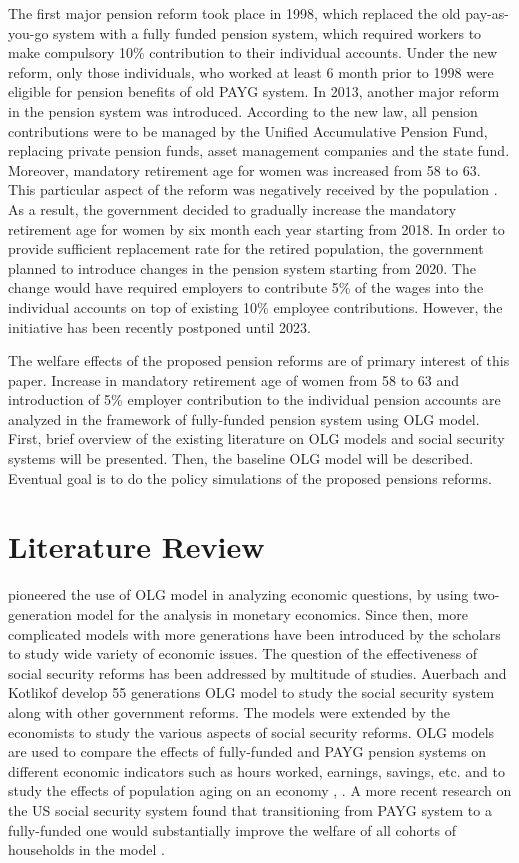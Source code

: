 \documentclass[ProjectUYA]{subfiles}
\begin{document}
The first major pension reform took place in 1998, which replaced the old pay-as-you-go system with a fully funded pension system, which required workers to make compulsory 10\% contribution to their individual accounts. Under the new reform, only those individuals, who worked at least 6 month prior to 1998 were eligible for pension benefits of old PAYG system. In 2013, another major reform in the pension system was introduced. According to the new law, all pension contributions were to be managed by the Unified Accumulative Pension Fund, replacing private pension funds, asset management companies and the state fund. Moreover, mandatory retirement age for women was increased from 58 to 63. This particular aspect of the reform was negatively received by the population \cite{maltseva}. As a result, the government decided to gradually increase the mandatory retirement age for women by six month each year starting from 2018. In order to provide sufficient replacement rate for the retired population, the government planned to introduce changes in the pension system starting from 2020. The change would have required employers to contribute 5\% of the wages into the individual accounts on top of existing 10\% employee contributions. However, the initiative has been recently postponed until 2023.



\newpage
The welfare effects of the proposed pension reforms are of primary interest of this paper. Increase in mandatory retirement age of women from 58 to 63 and introduction of 5\% employer contribution to the individual pension accounts are analyzed in the framework of fully-funded pension system using OLG model. First, brief overview of the existing literature on OLG models and social security systems will be presented. Then, the baseline OLG model will be described. Eventual goal is to do the policy simulations of the proposed pensions reforms. 


\section{Literature Review}
\cite{diamond} pioneered the use of OLG model in analyzing economic questions, by using two-generation model for the analysis in monetary economics. Since then, more complicated models with more generations have been introduced by the scholars to study wide variety of economic issues. The question of the effectiveness of social security reforms has been addressed by multitude of studies. Auerbach and Kotlikof \cite{auerbach} develop 55 generations OLG model to study the social security system along with other government reforms. The models were extended by the economists to study the various aspects of social security reforms. OLG models are used to compare the effects of fully-funded and PAYG pension systems on different economic indicators such as hours worked, earnings, savings, etc. \cite{buyse} and to study the effects of population aging on an economy \cite{muto}, \cite{heijdra}. A more recent research on the US social security system found that transitioning from PAYG system to a fully-funded one would substantially improve the welfare of all cohorts of households in the model \cite{mcgrattan}.
\end{document}
